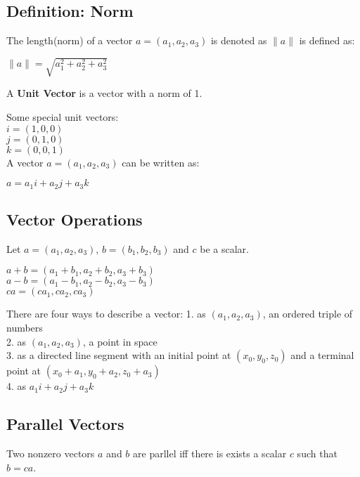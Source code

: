 \documentclass{article} %
\begin{document}
    \subsection*{Definition: Norm}
    The length(norm) of a vector $a = (a_1,a_2,a_3)$ is denoted as $\|a\|$ is defined as:
    \begin{center}
        $\|a\|=\sqrt{a^2_1+a^2_2+a^2_3}$
        
    \end{center}
    A \textbf{Unit Vector} is a vector with a norm of 1.

    Some special unit vectors:\\
    $i = (1,0,0)$\\
    $j = (0,1,0)$\\
    $k = (0,0,1)$\\
    A vector $a=(a_1,a_2,a_3)$ can be written as:
    \begin{center}
        $a = a_1i+a_2j+a_3k$
        
    \end{center}


    \subsection*{Vector Operations}
    Let $a = (a_1,a_2,a_3)$, $b = (b_1,b_2,b_3)$ and $c$ be a scalar.

    \begin{center}
        $a+b = (a_1+b_1,a_2+b_2,a_3+b_3)$\\
        $a-b = (a_1-b_1,a_2-b_2,a_3-b_3)$\\
        $ca=(ca_1,ca_2,ca_3)$
        
    \end{center}
    
    There are four ways to describe a vector:
    1. as $(a_1,a_2,a_3)$, an ordered triple of numbers\\
    2. as $(a_1,a_2,a_3)$, a point in space\\
    3. as a directed line segment with an initial point at $(x_0,y_0,z_0)$ and a terminal point at $(x_0+a_1,y_0+a_2,z_0+a_3)$\\
    4. as $a_1i+a_2j+a_3k$

    \subsection*{Parallel Vectors}
    Two nonzero vectors $a$ and $b$ are parllel iff there is exists a scalar $c$ such that
    $b = ca$.
    
    
    
    
    
    
    
    
    
    
    
    
    
    
    
\end{document}
